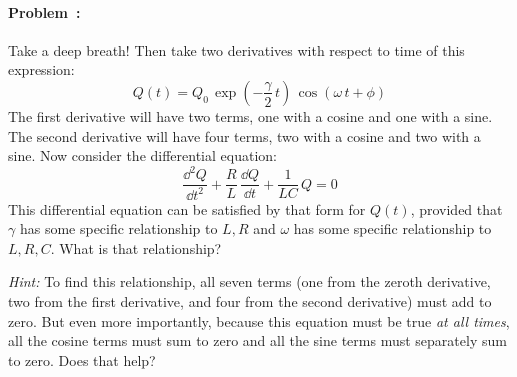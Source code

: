 \documentclass[12pt]{article}
\begin{document}
\paragraph{Problem~\theproblem:}%
Take a deep breath!
Then take two derivatives with respect to time of this expression:
\begin{equation}
  Q(t) = Q_0\,\exp(-\frac{\gamma}{2}\,t)\,\cos(\omega\,t+\phi)
\end{equation}
The first derivative will have two terms, one with a cosine and one
with a sine. The second derivative will have four terms, two with a
cosine and two with a sine. Now consider the differential equation:
\begin{equation}
  \frac{\dd^2 Q}{\dd t^2} + \frac{R}{L}\,\frac{\dd Q}{\dd t} + \frac{1}{LC}\,Q = 0
\end{equation}
This differential equation can be satisfied by that form for $Q(t)$,
provided that $\gamma$ has some specific relationship to $L, R$ and
$\omega$ has some specific relationship to $L, R, C$. What is that
relationship?

\textsl{Hint:} To find this relationship, all seven terms (one from
the zeroth derivative, two from the first derivative, and four from
the second derivative) must add to zero. But even more importantly,
because this equation must be true \emph{at all times}, all the cosine
terms must sum to zero and all the sine terms must separately sum to
zero. Does that help?
\end{document}
